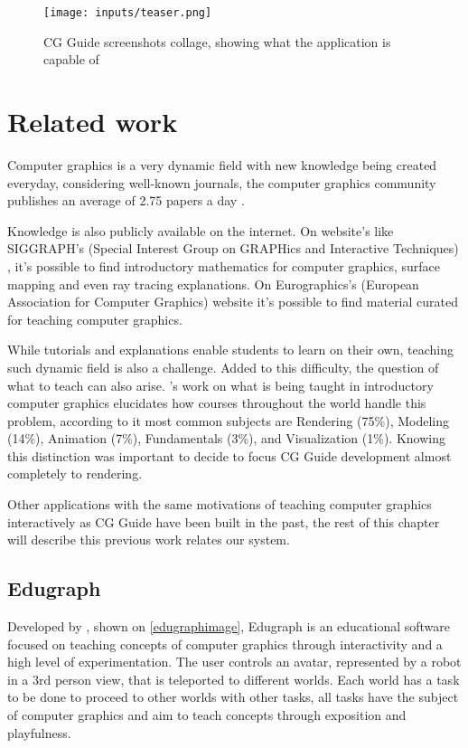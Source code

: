 \documentclass[cic,tc,english]{iiufrgs}
\begin{document}
\begin{figure}[hbt!]
    \caption{CG Guide screenshots collage, showing what the application is capable of}
    \begin{center}
        \texttt{[image: inputs/teaser.png]}
    \end{center}
    \label{systemteaser}
\end{figure}


\chapter{Related work}

Computer graphics is a very dynamic field with new knowledge being created everyday, considering well-known journals, the computer graphics community publishes an average of 2.75 papers a day \cite{walter2017whatareweteaching}.

Knowledge is also publicly available on the internet. On website's like SIGGRAPH's (Special Interest Group on GRAPHics and Interactive Techniques)  \cite{scott2015hypergraph}, it's possible to find introductory mathematics for computer graphics, surface mapping and even ray tracing explanations. On Eurographics's (European Association for Computer Graphics) website it's possible to find material curated for teaching computer graphics.

While tutorials and explanations enable students to learn on their own, teaching such dynamic field is also a challenge.  Added to this difficulty, the question of what to teach can also arise. \citet{walter2017whatareweteaching}'s work on what is being taught in introductory computer graphics elucidates how courses throughout the world handle this problem, according to it most common subjects are Rendering (75\%), Modeling (14\%), Animation (7\%), Fundamentals (3\%), and Visualization (1\%). Knowing this distinction was important to decide to focus CG Guide development almost completely to rendering.

Other applications with the same motivations of teaching computer graphics interactively as CG Guide have been built in the past, the rest of this chapter will describe this previous work relates our system.

\section{Edugraph}
Developed by \citet{Luiz_Battaiola2003Edugraph}, shown on \cref{edugraphimage}, Edugraph is an educational software focused on teaching concepts of computer graphics through interactivity and a high level of experimentation. The user controls an avatar, represented by a robot in a 3rd person view, that is teleported to different worlds. Each world has a task to be done to proceed to other worlds with other tasks, all tasks have the subject of computer graphics and aim to teach concepts through exposition and playfulness.
\end{document}
